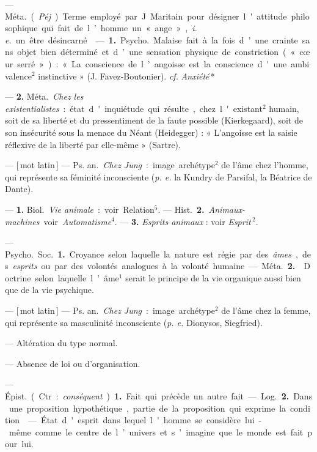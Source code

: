 \begin{itemize}[leftmargin=1cm, label=, itemsep=1pt]
{ — \si{Méta.} ({\it Péj}.) Terme
employé par J. Maritain pour désigner l'attitude philosophique qui
fait de l’homme un « ange », {\it i. e.} un
être désincarné.

 — {\bf 1.} \si{Psycho.} Malaise fait à
la fois d’une crainte sans objet bien
déterminé et d’une sensation physique de constriction (« cœur serré ») :
« La conscience de l’angoisse est la
conscience d'une ambivalence$^2$ instinctive » (J. Favez-Boutonier). {\it cf.} 
{\it Anxiété}\,*

— {\bf 2.} \si{Méta.} {\it Chez les existentialistes} :
état d'inquiétude qui résulte, chez
l'existant$^2$ humain, soit de sa liberté
et du pressentiment de la faute possible (Kierkegaard), soit de son
insécurité sous la menace du Néant
(Heidegger) : « L'angoisse est la
saisie réflexive de la liberté par
elle-même » (Sartre).

 — [\,mot latin\,] — \si{Ps. an.} {\it Chez
Jung} : image archétype$^2$ de l’âme
chez l’homme, qui représente sa
féminité inconsciente ({\it p. e.} la Kundry
de Parsifal, la Béatrice de Dante).

 — {\bf 1.} \si{Biol.} {\it Vie animale} : voir
Relation$^5$. — \si{Hist.} {\bf 2.} {\it Animaux-machines} voir {\it Automatisme}$^4$. —
 {\bf 3.} {\it Esprits animaux} : voir {\it Esprit}\,$^2$.

 — \si{Psycho.} \si{Soc.} {\bf 1.} Croyance
selon laquelle la nature est régie par
des {\it âmes}, des {\it esprits} ou par des
volontés analogues à la volonté
humaine.

— \si{Méta.} {\bf 2.}  Doctrine selon laquelle l’âme$^1$ serait le principe de
la vie organique aussi bien que de
la vie psychique.

 — [\,mot latin\,] — \si{Ps. an.} {\it Chez
Jung} : image archétype$^2$ de l'âme
chez la femme, qui représente sa
masculinité inconsciente ({\it p. e.} Dionysos, Siegfried).

 — Altération du type
normal.

 — Absence de loi ou d’organisation.

 — \si{Épist.} (Ctr. : {\it conséquent}). {\bf 1.} Fait qui précède un autre
fait. — \si{Log.} {\bf 2.} Dans une proposition
hypothétique, partie de la proposition qui exprime la condition.

 — État d'esprit
dans lequel l'homme se considère
lui-même comme le centre de l’univers et s’imagine que le monde est
fait pour lui.

}
\end{itemize}
